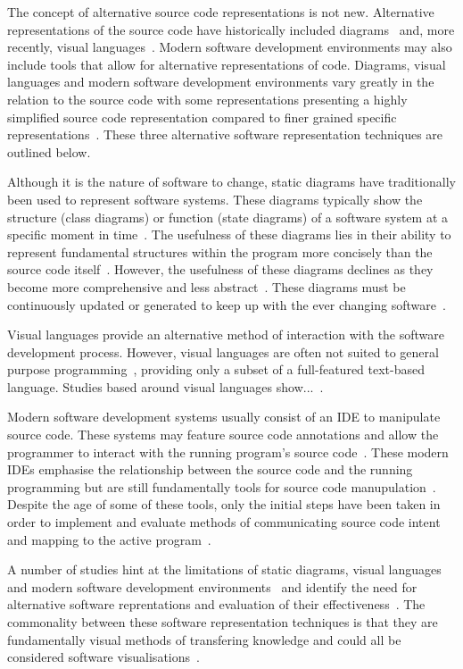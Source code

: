The concept of alternative source code representations is not new. Alternative representations of the source code have historically included diagrams~ and, more recently, visual languages~. Modern software development environments may also include tools that allow for alternative representations of code. Diagrams, visual languages and modern software development environments vary greatly in the relation to the source code with some representations presenting a highly simplified source code representation compared to finer grained specific representations~. These three alternative software representation techniques are outlined below.

Although it is the nature of software to change, static diagrams have traditionally been used to represent software systems. These diagrams typically show the structure (class diagrams) or function (state diagrams) of a software system at a specific moment in time~\cite{Rumbaugh2004}. The usefulness of these diagrams lies in their ability to represent fundamental structures within the program more concisely than the source code itself~. However, the usefulness of these diagrams declines as they become more comprehensive and less abstract~. These diagrams must be continuously updated or generated to keep up with the ever changing software~.

Visual languages provide an alternative method of interaction with the software development process. However, visual languages are often not suited to general purpose programming~\cite{Myers1989}, providing only a subset of a full-featured text-based language. Studies based around visual languages show...~.

Modern software development systems usually consist of an \ac{IDE} to manipulate source code. These systems may feature source code annotations and allow the programmer to interact with the running program's source code~. These modern \acp{IDE} emphasise the relationship between the source code and the running programming but are still fundamentally tools for source code manupulation~. Despite the age of some of these tools, only the initial steps have been taken in order to implement and evaluate methods of communicating source code intent and mapping to the active program~.

A number of studies hint at the limitations of static diagrams, visual languages and modern software development environments~ and identify the need for alternative software reprentations and evaluation of their effectiveness~. The commonality between these software representation techniques is that they are fundamentally visual methods of transfering knowledge and could all be considered software visualisations~.

